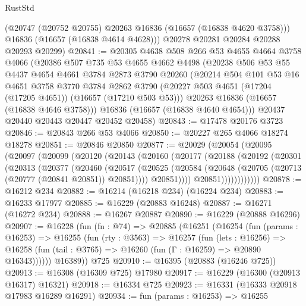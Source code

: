 \begin{lexlean}{RustStd}
\begin{coremodule}
        (@20747 (@20752 @20755) @20263 @16836 (@16657 (@16838 @4620 @3758)))
        @16836
        (@16657 (@16838 @4614 @4628)))
      @20278
      @20281
      @20284
      @20288
      @20293
      @20299)
@20841 := @20305
    @4638
    @508
    @266
    @53
    @4655
    @4664
    @3758
    @4066
    (@20386
      @507
      @735
      @53
      @4655
      @4662
      @4498
      (@20238
        @506
        @53
        @55
        @4437
        @4654
        @4661
        @3784
        @2873
        @3790
        @20260
        (@20214
          @504
          @101
          @53
          @16
          @4651
          @3758
          @3770
          @3784
          @2862
          @3790
          (@20227 @503 @4651 (@17204 (@17205 @4651)) (@16657 (@17210 @503 @53)))
          @20263
          @16836
          (@16657 (@16838 @4646 @3758)))
        @16836
        (@16657 (@16838 @4640 @4654)))
      @20437
      @20440
      @20443
      @20447
      @20452
      @20458)
@20843 := @17478 @20176 @3723
@20846 := @20843 @266 @53 @4066
@20850 := @20227 @265 @4066 @18274 @18278
@20851 := @20846 @20850
@20877 := @20029
    (@20054
      (@20095
        (@20097
          (@20099
            (@20120
              (@20143
                (@20160
                  (@20177
                    (@20188
                      (@20192
                        (@20301
                          (@20313
                            (@20377
                              (@20460
                                (@20517
                                  (@20525
                                    (@20584
                                      (@20648 (@20705 (@20713 (@20777 (@20841 @20851)) @20851))))
                                    @20851))))
                            @20851))))))))))))
@20878 := @16212 @234
@20882 := @16214 (@16218 @234) (@16224 @234)
@20883 := @16233 @17977
@20885 := @16229 (@20883 @16248)
@20887 := @16271 (@16272 @234)
@20888 := @16267 @20887
@20890 := @16229 (@20888 @16296)
@20907 := @16228
    (fun (fn : @74) =>
    @20885
      (@16251
        (@16254
          (fun (params : @16253) =>
          @16255
            (fun (rty : @3563) =>
            @16257
              (fun (lets : @16256) =>
              @16258 (fun (tail : @3765) => @16260 (fun (Γ : @16259) => @20890 @16343))))))
        @16389))
    @725
@20910 := @16395 (@20883 (@16246 @725))
@20913 := @16308 (@16309 @725) @17980
@20917 := @16229 (@16300 (@20913 @16317) @16321)
@20918 := @16334 @725
@20923 := @16331 (@16333 @20918 @17983 @16289 @16291)
@20934 := fun (params : @16253) =>
  @16255

\end{coremodule}
\end{lexlean}
